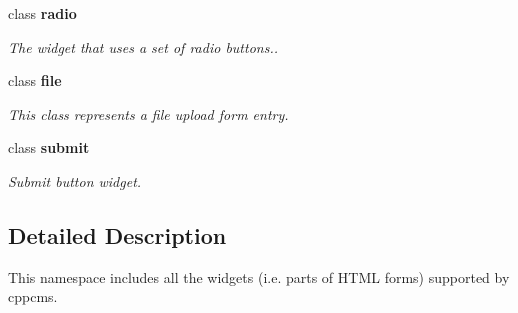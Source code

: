 \begin{DoxyCompactItemize}
class {\bf radio}
\begin{DoxyCompactList}\small\item\em The widget that uses a set of radio buttons.. \end{DoxyCompactList}\item 
class {\bf file}
\begin{DoxyCompactList}\small\item\em This class represents a file upload form entry. \end{DoxyCompactList}\item 
class {\bf submit}
\begin{DoxyCompactList}\small\item\em Submit button widget. \end{DoxyCompactList}\end{DoxyCompactItemize}


\subsection{Detailed Description}
This namespace includes all the widgets (i.\-e. parts of H\-T\-M\-L forms) supported by cppcms. 